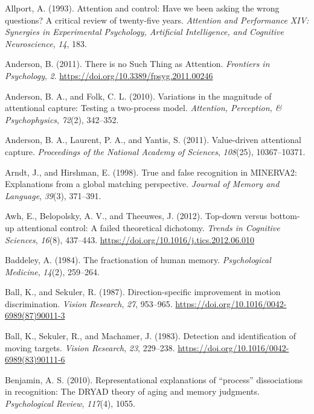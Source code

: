 \documentclass[]{DissertateCUNY}
\begin{document}
\leavevmode\hypertarget{ref-allport_attention_1993}{}%
Allport, A. (1993). Attention and control: Have we been asking the wrong
questions? A critical review of twenty-five years. \emph{Attention and
Performance XIV: Synergies in Experimental Psychology, Artificial
Intelligence, and Cognitive Neuroscience}, \emph{14}, 183.

\leavevmode\hypertarget{ref-anderson_there_2011}{}%
Anderson, B. (2011). There is no Such Thing as Attention.
\emph{Frontiers in Psychology}, \emph{2}.
\url{https://doi.org/10.3389/fpsyg.2011.00246}

\leavevmode\hypertarget{ref-anderson_variations_2010}{}%
Anderson, B. A., and Folk, C. L. (2010). Variations in the magnitude of
attentional capture: Testing a two-process model. \emph{Attention,
Perception, \& Psychophysics}, \emph{72}(2), 342--352.

\leavevmode\hypertarget{ref-anderson_value-driven_2011}{}%
Anderson, B. A., Laurent, P. A., and Yantis, S. (2011). Value-driven
attentional capture. \emph{Proceedings of the National Academy of
Sciences}, \emph{108}(25), 10367--10371.

\leavevmode\hypertarget{ref-arndt_true_1998}{}%
Arndt, J., and Hirshman, E. (1998). True and false recognition in
MINERVA2: Explanations from a global matching perspective. \emph{Journal
of Memory and Language}, \emph{39}(3), 371--391.

\leavevmode\hypertarget{ref-awh_top-down_2012}{}%
Awh, E., Belopolsky, A. V., and Theeuwes, J. (2012). Top-down versus
bottom-up attentional control: A failed theoretical dichotomy.
\emph{Trends in Cognitive Sciences}, \emph{16}(8), 437--443.
\url{https://doi.org/10.1016/j.tics.2012.06.010}

\leavevmode\hypertarget{ref-baddeley_fractionation_1984}{}%
Baddeley, A. (1984). The fractionation of human memory.
\emph{Psychological Medicine}, \emph{14}(2), 259--264.

\leavevmode\hypertarget{ref-ball_direction-specific_1987}{}%
Ball, K., and Sekuler, R. (1987). Direction-specific improvement in
motion discrimination. \emph{Vision Research}, \emph{27}, 953--965.
\url{https://doi.org/10.1016/0042-6989(87)90011-3}

\leavevmode\hypertarget{ref-ball_detection_1983}{}%
Ball, K., Sekuler, R., and Machamer, J. (1983). Detection and
identification of moving targets. \emph{Vision Research}, \emph{23},
229--238. \url{https://doi.org/10.1016/0042-6989(83)90111-6}

\leavevmode\hypertarget{ref-benjamin_representational_2010}{}%
Benjamin, A. S. (2010). Representational explanations of ``process''
dissociations in recognition: The DRYAD theory of aging and memory
judgments. \emph{Psychological Review}, \emph{117}(4), 1055.
\end{document}
